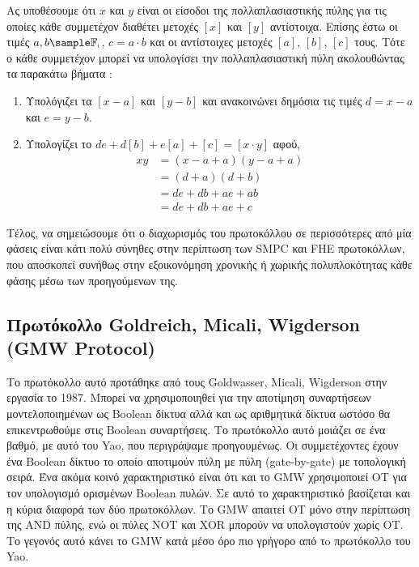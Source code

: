 Ας υποθέσουμε ότι $x$ και $y$ είναι οι είσοδοι της πολλαπλασιαστικής πύλης για τις οποίες κάθε συμμετέχον διαθέτει μετοχές $[x]$ και $[y]$ αντίστοιχα. Επίσης έστω οι τιμές $a, b \sample \mathbb{F_p}$, $c=a \cdot b$ και οι αντίστοιχες μετοχές $[a]$, $[b]$, $[c]$ τους. Τότε ο κάθε συμμετέχον μπορεί να υπολογίσει την πολλαπλασιαστική πύλη ακολουθώντας τα παρακάτω βήματα :

\begin{enumerate}
    \item Υπολόγιζει τα $[x - a]$ και $[y - b]$ και ανακοινώνει δημόσια τις τιμές $d = x - a$ και $e = y - b$.
    \item Υπολογίζει το $de + d[b] + e[a] + [c] = [x \cdot y]$ αφού,
    \begin{align}
        xy &= (x - a + a)(y - a + a) \\
           &= (d + a)(d + b) \\
           &= de + db + ae + ab \\
           &= de + db + ae + c
    \end{align}
\end{enumerate}

Τέλος, να σημειώσουμε ότι ο διαχωρισμός του πρωτοκόλλου σε περισσότερες από μία φάσεις είναι κάτι πολύ σύνηθες στην περίπτωση των SMPC και FHE πρωτοκόλλων, που αποσκοπεί συνήθως στην εξοικονόμηση  χρονικής ή χωρικής πολυπλοκότητας κάθε φάσης μέσω των προηγούμενων της.

\subsection{Πρωτόκολλο Goldreich, Micali, Wigderson (GMW Protocol)}

Το πρωτόκολλο αυτό προτάθηκε από τους Goldwasser, Micali, Wigderson στην εργασία \cite{goldreich2019play} το 1987. Μπορεί να χρησιμοποιηθεί για την αποτίμηση συναρτήσεων μοντελοποιημένων ως Boolean δίκτυα αλλά και ως αριθμητικά δίκτυα ωστόσο θα επικεντρωθούμε στις Boolean συναρτήσεις. Το πρωτόκολλο αυτό μοιάζει σε ένα βαθμό, με αυτό του Yao, που περιγράψαμε προηγουμένως. Οι συμμετέχοντες έχουν ένα Boolean δίκτυο το οποίο αποτιμούν πύλη με πύλη (gate-by-gate) με τοπολογική σειρά. Ένα ακόμα κοινό χαρακτηριστικό είναι ότι και το GMW χρησιμοποιεί OT για τον υπολογισμό ορισμένων Boolean πυλών. Σε αυτό το χαρακτηριστικό βασίζεται και η κύρια διαφορά των δύο πρωτοκόλλων. Το GMW απαιτεί ΟΤ μόνο στην περίπτωση της AND πύλης, ενώ οι πύλες NOT και XOR μπορούν να υπολογιστούν χωρίς OT. Το γεγονός αυτό κάνει το GMW κατά μέσο όρο πιο γρήγορο από τo πρωτόκολλο του Yao.

